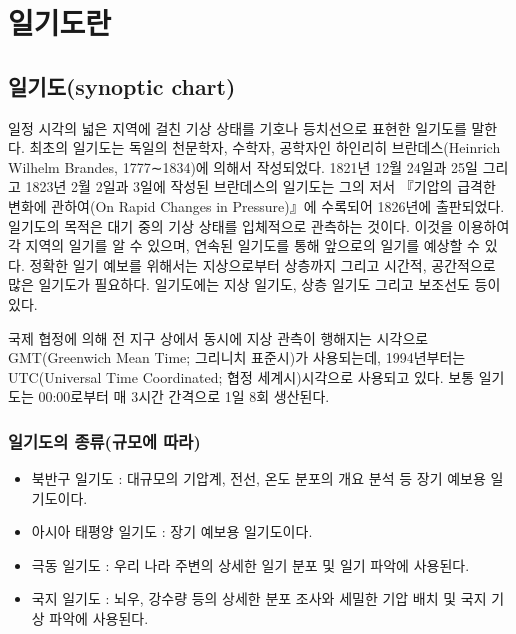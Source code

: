 
\section{일기도란}

\subsection{일기도(synoptic chart)}

일정 시각의 넓은 지역에 걸친 기상 상태를 기호나 등치선으로 표현한 일기도를 말한다. 최초의 일기도는 독일의 천문학자, 수학자, 공학자인 하인리히 브란데스(Heinrich Wilhelm Brandes, 1777∼1834)에 의해서 작성되었다. 1821년 12월 24일과 25일 그리고 1823년 2월 2일과 3일에 작성된 브란데스의 일기도는 그의 저서 『기압의 급격한 변화에 관하여(On Rapid Changes in Pressure)』에 수록되어 1826년에 출판되었다.
일기도의 목적은 대기 중의 기상 상태를 입체적으로 관측하는 것이다. 이것을 이용하여 각 지역의 일기를 알 수 있으며, 연속된 일기도를 통해 앞으로의 일기를 예상할 수 있다. 정확한 일기 예보를 위해서는 지상으로부터 상층까지 그리고 시간적, 공간적으로 많은 일기도가 필요하다. 일기도에는 지상 일기도, 상층 일기도 그리고 보조선도 등이 있다.

국제 협정에 의해 전 지구 상에서 동시에 지상 관측이 행해지는 시각으로 GMT(Greenwich Mean Time; 그리니치 표준시)가 사용되는데, 1994년부터는 UTC(Universal Time Coordinated; 협정 세계시)시각으로 사용되고 있다. 보통 일기도는 00:00로부터 매 3시간 간격으로 1일 8회 생산된다.


\subsubsection{일기도의 종류(규모에 따라)}

\begin{itemize}
	\item 북반구 일기도 : 대규모의 기압계, 전선, 온도 분포의 개요 분석 등 장기 예보용 일기도이다.
	\item 아시아 태평양 일기도 : 장기 예보용 일기도이다.
	\item 극동 일기도 : 우리 나라 주변의 상세한 일기 분포 및 일기 파악에 사용된다.
	\item 국지 일기도 : 뇌우, 강수량 등의 상세한 분포 조사와 세밀한 기압 배치 및 국지 기상 파악에 사용된다.
\end{itemize}

